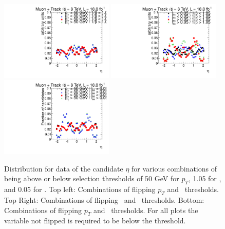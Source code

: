 \begin{figure}
\begin{center}
\includegraphics[clip=false, trim=0.0cm 0cm 0.0cm 0cm, width=0.48\textwidth]{figures/tkmu/Selection_Data8TeV_EtaRegionsPtTOF_016}
\includegraphics[clip=false, trim=0.0cm 0cm 0.0cm 0cm, width=0.48\textwidth]{figures/tkmu/Selection_Data8TeV_EtaRegionsTOFdEdx_016} \\
\includegraphics[clip=false, trim=0.0cm 0cm 0.0cm 0cm, width=0.48\textwidth]{figures/tkmu/Selection_Data8TeV_EtaRegionsPtdEdx_016}
\end{center}
\caption[Distribution for data of the candidate $\eta$ for various combinations of being above or below selection thresholds in the \tktof\ analysis]
{Distribution for data of the candidate $\eta$ for various combinations of being above or below selection thresholds of
50 GeV for $p_T$, 1.05 for \invbeta, and 0.05 for \ias.
Top left: Combinations of flipping $p_T$ and \invbeta\ thresholds. Top Right: Combinations of flipping \invbeta\ and \ias\ thresholds.
Bottom: Combinations of flipping $p_T$ and \ias\ thresholds. For all plots the variable not flipped is required to be below the threshold.}
\label{fig:etacorrelation}
\end{figure}

